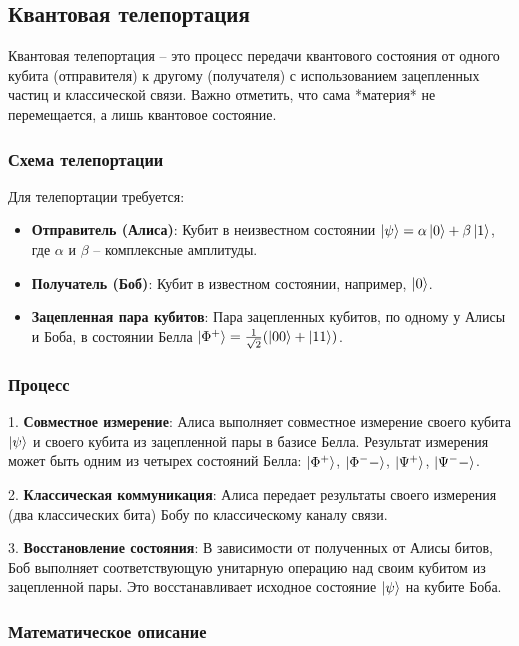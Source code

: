 \documentclass[12pt,a4paper]{article}
\begin{document}
	\subsection{Квантовая телепортация}
	Квантовая телепортация -- это процесс передачи квантового состояния от одного кубита (отправителя) к другому (получателя) с использованием зацепленных частиц и классической связи. Важно отметить, что сама *материя* не перемещается, а лишь квантовое состояние.
	
	\subsubsection{Схема телепортации}
	
	Для телепортации требуется:
	
	\begin{itemize}
		\item \textbf{Отправитель (Алиса)}: Кубит в неизвестном состоянии $\ket{\psi} = \alpha \ket{0} + \beta \ket{1}$, где $\alpha$ и $\beta$ -- комплексные амплитуды.
		\item \textbf{Получатель (Боб)}: Кубит в известном состоянии, например, $\ket{0}$.
		\item \textbf{Зацепленная пара кубитов}: Пара зацепленных кубитов, по одному у Алисы и Боба, в состоянии Белла $\ket{\Phi^+} = \frac{1}{\sqrt{2}}(\ket{00} + \ket{11})$.
	\end{itemize}
	
	
	\subsubsection{Процесс}
	
	1. \textbf{Совместное измерение}: Алиса выполняет совместное измерение своего кубита $\ket{\psi}$ и своего кубита из зацепленной пары в базисе Белла. Результат измерения может быть одним из четырех состояний Белла: $\ket{\Phi^+}$, $\ket{\Phi^--}$, $\ket{\Psi^+}$, $\ket{\Psi^--}$.
	
	2. \textbf{Классическая коммуникация}: Алиса передает результаты своего измерения (два классических бита) Бобу по классическому каналу связи.
	
	3. \textbf{Восстановление состояния}: В зависимости от полученных от Алисы битов, Боб выполняет соответствующую унитарную операцию над своим кубитом из зацепленной пары. Это восстанавливает исходное состояние $\ket{\psi}$ на кубите Боба.
	
	\subsubsection{Математическое описание}
	
\end{document}
